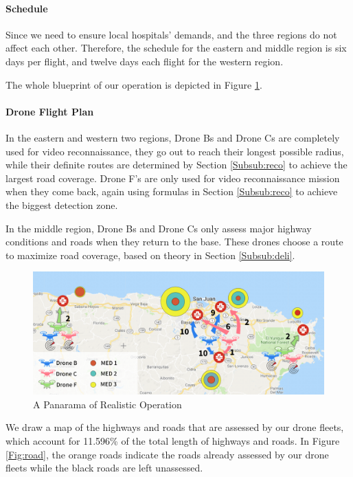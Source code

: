 \documentclass{mcmthesis}
\begin{document}
\paragraph{Schedule} Since we need to ensure local hospitals' demands, and the three regions do not affect each other. Therefore, the schedule for the eastern and middle region is six days per flight, and twelve days each flight for the western region.

\noindent The whole blueprint of our operation is depicted in Figure \ref{Fig:beau}.

\paragraph{Drone Flight Plan} In the eastern and western two regions, Drone Bs and Drone Cs are completely used for video reconnaissance, they go out to reach their longest possible radius, while their definite routes are determined by Section \ref{Subsub:reco} to achieve the largest road coverage. Drone F's are only used for video reconnaissance mission when they come back, again using formulas in Section \ref{Subsub:reco} to achieve the biggest detection zone.

\noindent In the middle region, Drone Bs and Drone Cs only assess major highway conditions and roads when they return to the base. These drones choose a route to maximize road coverage, based on theory in Section \ref{Subsub:deli}.
\begin{figure}[htbp]
    \centering
    \includegraphics[width=14cm]{figures/beautiful.png}
    \caption{A Panarama of Realistic Operation}
    \label{Fig:beau}
\end{figure}

\noindent We draw a map of the highways and roads that are assessed by our drone fleets, which account for 11.596\% of the total length of highways and roads. In Figure \ref{Fig:road}, the orange roads indicate the roads already assessed by our drone fleets while the black roads are left unassessed.
\end{document}
